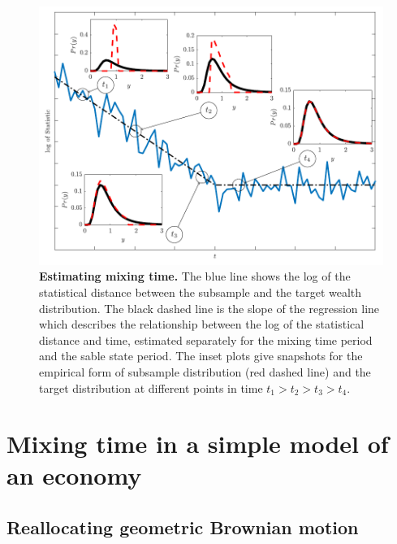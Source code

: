 \documentclass[11pt]{article}
\numberwithin{equation}{section}
\begin{document}
\begin{figure}[!htb]
\centering
\includegraphics[width=1.0\textwidth]{figs/fig_mixing_time.pdf}
\textcolor{red}{\caption{\textbf{Estimating mixing time.} The blue line shows the log of the statistical distance between the subsample and the target wealth distribution. The black dashed line is the slope of the regression line which describes the relationship between the log of the statistical distance and time, estimated separately for the mixing time period and the sable state period. The inset plots give snapshots for the empirical form of subsample distribution (red dashed line) and the target distribution at different points in time $t_1 > t_2 > t_3 > t_4$.  %
\label{fig:mixing-time}}}
\end{figure}
\FloatBarrier

\section{Mixing time in a simple model of an economy}\label{sec:rgbm}
\subsection{Reallocating geometric Brownian motion}
\end{document}
